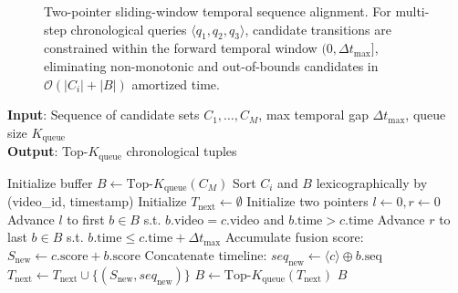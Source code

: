 \begin{figure}[t]
{%
    }
    \vspace{-2mm}
    \caption{Two-pointer sliding-window temporal sequence alignment. For multi-step chronological queries $\langle q_1, q_2, q_3 \rangle$, candidate transitions are constrained within the forward temporal window $(0, \Delta t_{\max}]$, eliminating non-monotonic and out-of-bounds candidates in $\mathcal{O}(|C_i| + |B|)$ amortized time.}
    \label{fig:temporal_dp}
    \vspace{-2mm}
\end{figure}

\begin{algorithm}[t]
\caption{Two-Pointer Sliding-Window Temporal DP}
\label{alg:dp}
\textbf{Input}: Sequence of candidate sets $C_1, \dots, C_M$, max temporal gap $\Delta t_{\max}$, queue size $K_{\text{queue}}$ \\
\textbf{Output}: Top-$K_{\text{queue}}$ chronological tuples
\begin{algorithmic}[1]
\STATE Initialize buffer $B \leftarrow \text{Top-}K_{\text{queue}}(C_M)$
    \STATE Sort $C_i$ and $B$ lexicographically by (video\_id, timestamp)
    \STATE Initialize $T_{\text{next}} \leftarrow \emptyset$
    \STATE Initialize two pointers $l \leftarrow 0, r \leftarrow 0$
        \STATE Advance $l$ to first $b \in B$ s.t. $b.\text{video} = c.\text{video}$ and $b.\text{time} > c.\text{time}$
        \STATE Advance $r$ to last $b \in B$ s.t. $b.\text{time} \le c.\text{time} + \Delta t_{\max}$
            \STATE Accumulate fusion score: $S_{\text{new}} \leftarrow c.\text{score} + b.\text{score}$
            \STATE Concatenate timeline: $seq_{\text{new}} \leftarrow \langle c \rangle \oplus b.\text{seq}$
            \STATE $T_{\text{next}} \leftarrow T_{\text{next}} \cup \{(S_{\text{new}}, seq_{\text{new}})\}$
        \ENDFOR
    \ENDFOR
    \STATE $B \leftarrow \text{Top-}K_{\text{queue}}(T_{\text{next}})$
\ENDFOR
\RETURN $B$
\end{algorithmic}
\end{algorithm}

